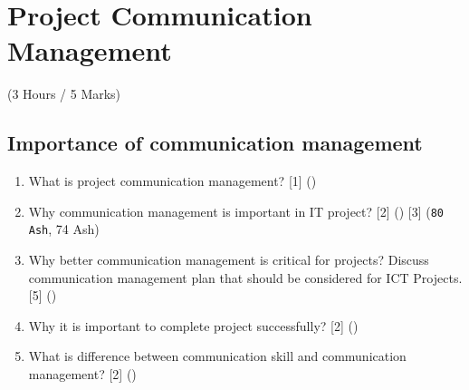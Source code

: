 \documentclass[12pt]{article}
\begin{document}
\pagebreak

\section{Project Communication Management}
  \begin{center}(3 Hours / 5 Marks)\end{center}

  \subsection{Importance of communication management}
    \begin{enumerate}
      \item What is project communication management? \hfill [1] ()

      \item Why communication management is important in IT project? \hfill [2] () [3] (\texttt{80 Ash}, 74 Ash)

      \item Why better communication management is critical for projects? Discuss communication management plan that should be considered for ICT Projects. \hfill [5] ()

      \item Why it is important to complete project successfully? \hfill [2] ()

      \item What is difference between communication skill and communication management? \hfill [2] ()
    \end{enumerate}
\end{document}
